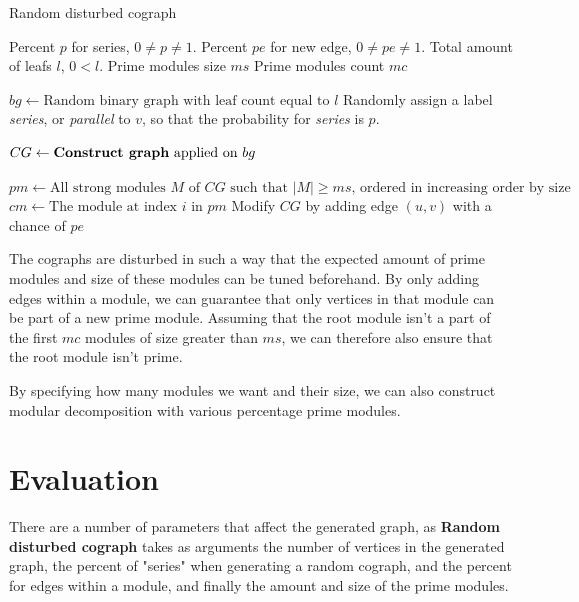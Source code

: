 \documentclass[a4paper]{article}
\begin{document}
\begin{algorithm}[H]
    \caption{Random disturbed cograph}
  \label{alg:RDCG}
  \begin{algorithmic}[1]
      \REQUIRE Percent $p$ for series, $0 \neq p \neq 1$.
      \REQUIRE Percent $pe$ for new  edge, $0 \neq pe \neq 1$.
      \REQUIRE Total amount of leafs $l$, $0 < l$.
      \REQUIRE Prime modules size $ms$
      \REQUIRE Prime modules count $mc$

      \STATE $bg \leftarrow \text{Random binary graph with leaf count equal to $l$}$
        \STATE Randomly assign a label  \textit{series}, or \textit{parallel} to $v$, so
        that the probability for \textit{series} is $p$.
      \ENDFOR

      \STATE $CG \leftarrow \text{\textbf{Construct graph} applied on $bg$}$

      \STATE $pm \leftarrow \text{All strong modules $M$ of $CG$ such that $|M| \geq ms$, ordered in increasing order by size}$
        \STATE $cm \leftarrow \text{The module at index $i$ in $pm$}$
            \STATE Modify $CG$ by adding edge $(u,v)$ with a chance of $pe$
        \ENDFOR
      \ENDFOR
  \end{algorithmic}
\end{algorithm}

The cographs are disturbed in such a way that the expected amount of prime
modules and size of these modules can be tuned beforehand. By only adding edges
within a module, we can guarantee that only vertices in that module can be part
of a new prime module.  Assuming that the root module isn't a part of the first
$mc$ modules of size greater than $ms$, we can therefore also ensure that the
root module isn't prime.

By specifying how many modules we want and their size, we
can also construct modular decomposition with various percentage prime modules.

\section{Evaluation} 
\label{sec:Evaluation} 

There are a number of parameters that affect the generated graph, as
\textbf{Random disturbed cograph} takes as arguments the number of vertices in
the generated graph, the percent of "series" when generating a random cograph,
and the percent for edges within a module, and finally the amount and size of
the prime modules. 
\end{document}
